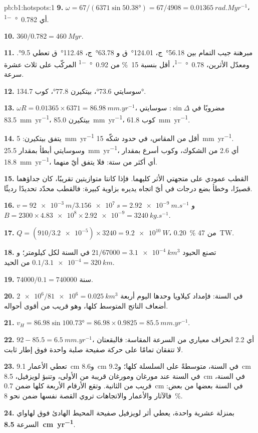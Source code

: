 \begin{solution}{pb:b1:hotspots:1}
\textbf{9.} $\omega = 67/(6371\sin\ang{50.38}) = 67/4908 =
\qty{0.01365}{rad.Myr^{-1}}$، أي \qty{0.782}{\degree\per\Myr}.

\textbf{10.} $360/0.782 = \qty{460}{Myr}$.

\textbf{11.} مبرهنة جيب التمام بين \ang{56.18}~ج، \ang{124.01}~ق و
\ang{63.78}~ج، \ang{112.48}~ق تعطي \ang{9.5}. ومعدّل الأثرين، \qty{0.78}{\degree\per\Myr}، أقل بنسبة \qty{15}{\percent} من \qty{0.92}{\degree\per\Myr} المركّب على ثلاث عشرة سرعة.

\textbf{12.} سوسايتي \ang{73.6}، بيتكيرن \ang{77.8}، كوب \ang{134.7}.

\textbf{13.} $\omega R = 0.01365\times6371 = \qty{86.98}{mm.yr^{-1}}$، مضروبًا في
$\sin\Delta$: سوسايتي \qty{83.5}{mm.yr^{-1}}، بيتكيرن
\qty{85.0}{mm.yr^{-1}}، كوب \qty{61.8}{mm.yr^{-1}}.

\textbf{14.} يتفق بيتكيرن: \qty{5}{mm.yr^{-1}} أقل من المقاس، في حدود شكّه \qty{15}{mm.yr^{-1}}. وسوسايتي أبطأ بمقدار \qty{25.5}{mm.yr^{-1}}، أي 2.6 من الشكوك، وكوب أسرع بمقدار \qty{18.8}{mm.yr^{-1}}، أي أكثر من ستة: فلا يتفق أيّ منهما.

\textbf{15.} القطب عمودي على متجهتي الأثر كليهما. فإذا كانتا متوازيتين تقريبًا، كان جداؤهما قصيرًا، وخطأ بضع درجات في أيّ اتجاه يديره بزاوية كبيرة: فالقطب محدّد تحديدًا رديئًا.

\textbf{16.} $v = \qty{92e-3}{m}/\qty{3.156e7}{s} = \qty{2.92e-9}{m.s^{-1}}$
و$B = 2300\times\num{4.83e8}\times\num{2.92e-9} = \qty{3240}{kg.s^{-1}}$.

\textbf{17.} $Q = (910/\num{3.2e-5})\times3240 = \qty{9.2e10}{W}$،
\qty{0.20}{\percent} من \qty{47}{TW}.

\textbf{18.} تصنع الحيود $21/67000 = \qty{3.1e-4}{km^3}$ في السنة لكل كيلومتر؛ و$0.1/\num{3.1e-4} = \qty{320}{km}$ من الحيد.

\textbf{19.} $74000/0.1 = \num{740000}$ سنة.

\textbf{20.} $\num{2e6}/\num{81e6} = \qty{0.025}{km^3}$ في السنة: فإمداد كيلاويا وحدها اليوم أربعة أضعاف الناتج المتوسط  كلها، وهو قريب من أقوى أحواله.

\textbf{21.} $v_H = 86.98\sin\ang{100.73} = 86.98\times0.9825 =
\qty{85.5}{mm.yr^{-1}}$.

\textbf{22.} $92 - 85.5 = \qty{6.5}{mm.yr^{-1}}$، أي 2.2 انحراف معياري من السرعة المقاسة: فالبقعتان لا تتفقان تمامًا على حركة صفيحة صلبة واحدة فوق إطار ثابت.

\textbf{23.} تعطي الأعمار \qty{9.1}{cm} و\qty{8.6}{cm} في السنة، متوسطةً على السلسلة كلها؛ و\qty{9.2}{cm} في السنة عند مورغان ومورغان قريبة من الأولى، وتنبؤ لويزفيل، \qty{8.5}{cm} في السنة، قريب من الثانية. وتقع الأرقام الأربعة كلها ضمن \qty{0.7}{cm} في السنة بعضها من بعض: فالآثار والأعمار والاتجاهات تروي القصة نفسها ضمن نحو \qty{8}{\percent}.

\textbf{24.} بمنزلة عشرية واحدة، يعطي أثر لويزفيل صفيحة المحيط الهادئ فوق  لهاواي السرعة \textbf{\qty[text-series-to-math=true]{8.5}{cm.yr^{-1}}}.
\end{solution}
